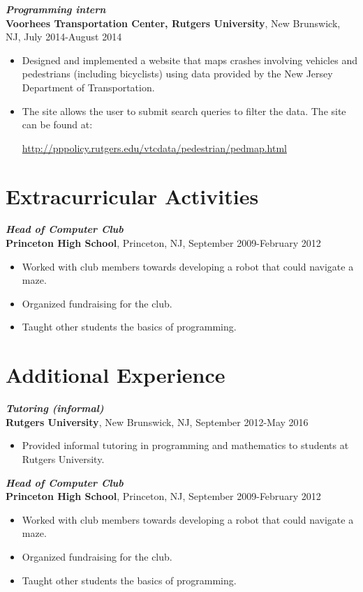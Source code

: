 \documentclass[letterpaper,12pt]{article}
\begin{document}
\textit{\textbf{Programming intern}} \\
\textbf{Voorhees Transportation Center, Rutgers University}, New Brunswick, NJ, July 2014-August 
2014
\begin{itemize}
\item
Designed and implemented a website that maps crashes involving vehicles and pedestrians (including 
bicyclists) using data provided by the New Jersey Department of Transportation.
\item
The site allows the user to submit search queries to filter the data. The site can be found at:
\begin{center}
\url{http://pppolicy.rutgers.edu/vtcdata/pedestrian/pedmap.html}
\end{center}
\end{itemize}

\section*{Extracurricular Activities}

\textit{\textbf{Head of Computer Club}} \\
\textbf{Princeton High School}, Princeton, NJ, September 2009-February 2012
\begin{itemize}
\item
Worked with club members towards developing a robot that could navigate a maze.
\item
Organized fundraising for the club.
\item
Taught other students the basics of programming.
\end{itemize}

\iffalse

\section*{Additional Experience}

\textit{\textbf{Tutoring (informal)}} \\
\textbf{Rutgers University}, New Brunswick, NJ, September 2012-May 2016
\begin{itemize}
\item
Provided informal tutoring in programming and mathematics to students at Rutgers University.
\end{itemize}

\textit{\textbf{Head of Computer Club}} \\
\textbf{Princeton High School}, Princeton, NJ, September 2009-February 2012
\begin{itemize}
\item
Worked with club members towards developing a robot that could navigate a maze.
\item
Organized fundraising for the club.
\item
Taught other students the basics of programming.
\end{itemize}
\end{document}
